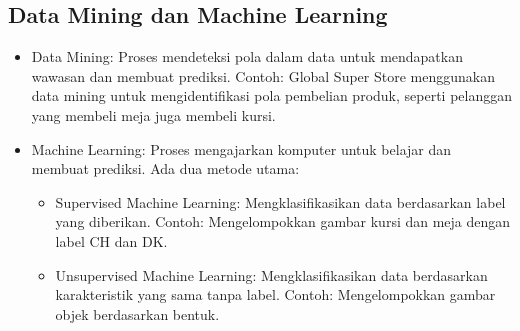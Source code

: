 \documentclass{article}
\begin{document}
\subsection{Data Mining dan Machine Learning}
\begin{itemize}
    \item Data Mining: Proses mendeteksi pola dalam data untuk mendapatkan wawasan dan membuat prediksi. Contoh: Global Super Store menggunakan data mining untuk mengidentifikasi pola pembelian produk, seperti pelanggan yang membeli meja juga membeli kursi.
    \item Machine Learning: Proses mengajarkan komputer untuk belajar dan membuat prediksi. Ada dua metode utama:
          \begin{itemize}
              \item Supervised Machine Learning: Mengklasifikasikan data berdasarkan label yang diberikan. Contoh: Mengelompokkan gambar kursi dan meja dengan label CH dan DK.
              \item Unsupervised Machine Learning: Mengklasifikasikan data berdasarkan karakteristik yang sama tanpa label. Contoh: Mengelompokkan gambar objek berdasarkan bentuk.
          \end{itemize}
\end{itemize}
\end{document}
